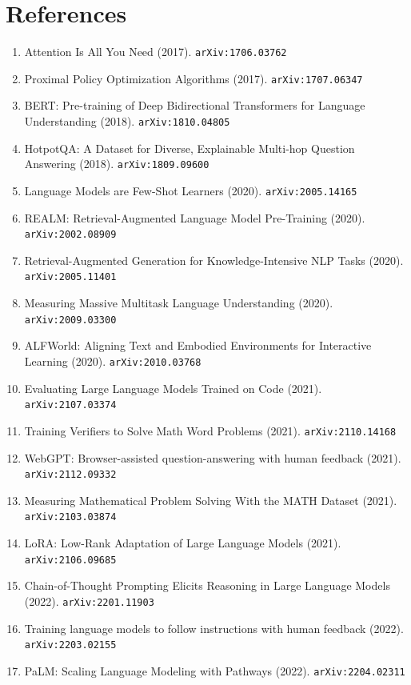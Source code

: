 \documentclass[11pt]{article}
\begin{document}
\section*{References}
\begin{enumerate}\small
  \item Attention Is All You Need (2017). \texttt{arXiv:1706.03762}
  \item Proximal Policy Optimization Algorithms (2017). \texttt{arXiv:1707.06347}
  \item BERT: Pre-training of Deep Bidirectional Transformers for Language
  Understanding (2018). \texttt{arXiv:1810.04805}
  \item HotpotQA: A Dataset for Diverse, Explainable Multi-hop Question
  Answering (2018). \texttt{arXiv:1809.09600}
  \item Language Models are Few-Shot Learners (2020). \texttt{arXiv:2005.14165}
  \item REALM: Retrieval-Augmented Language Model Pre-Training (2020). \texttt{arXiv:2002.08909}
  \item Retrieval-Augmented Generation for Knowledge-Intensive NLP Tasks (2020). \texttt{arXiv:2005.11401}
  \item Measuring Massive Multitask Language Understanding (2020). \texttt{arXiv:2009.03300}
  \item ALFWorld: Aligning Text and Embodied Environments for Interactive
  Learning (2020). \texttt{arXiv:2010.03768}
  \item Evaluating Large Language Models Trained on Code (2021). \texttt{arXiv:2107.03374}
  \item Training Verifiers to Solve Math Word Problems (2021). \texttt{arXiv:2110.14168}
  \item WebGPT: Browser-assisted question-answering with human feedback (2021). \texttt{arXiv:2112.09332}
  \item Measuring Mathematical Problem Solving With the MATH Dataset (2021). \texttt{arXiv:2103.03874}
  \item LoRA: Low-Rank Adaptation of Large Language Models (2021). \texttt{arXiv:2106.09685}
  \item Chain-of-Thought Prompting Elicits Reasoning in Large Language Models (2022). \texttt{arXiv:2201.11903}
  \item Training language models to follow instructions with human feedback (2022). \texttt{arXiv:2203.02155}
  \item PaLM: Scaling Language Modeling with Pathways (2022). \texttt{arXiv:2204.02311}

\end{enumerate}
\end{document}
